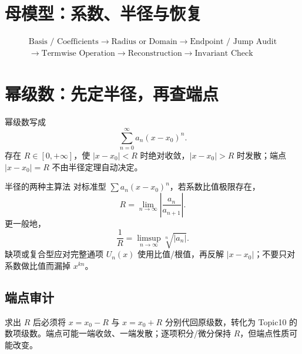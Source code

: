 \documentclass[11pt,a4paper,fontset=fandol]{ctexart}
\begin{document}
\section{母模型：系数、半径与恢复}
\[
\boxed{\begin{gathered}
\text{Basis / Coefficients}\to\text{Radius or Domain}\to\text{Endpoint / Jump Audit}\\
\to\text{Termwise Operation}\to\text{Reconstruction}\to\text{Invariant Check}
\end{gathered}}
\]
\begin{center}
\end{center}

\section{幂级数：先定半径，再查端点}
幂级数写成
\[
\sum_{n=0}^{\infty}a_n(x-x_0)^n.
\]
存在 $R\in[0,+\infty]$，使 $\lvert x-x_0\rvert<R$ 时绝对收敛，$\lvert x-x_0\rvert>R$ 时发散；端点 $\lvert x-x_0\rvert=R$ 不由半径定理自动决定。

\begin{methodbox}{半径的两种主算法}
对标准型 $\sum a_n(x-x_0)^n$，若系数比值极限存在，
\[
R=\lim_{n\to\infty}\left\lvert\frac{a_n}{a_{n+1}}\right\rvert.
\]
更一般地，
\[
\frac1R=\limsup_{n\to\infty}\sqrt[n]{\lvert a_n\rvert}.
\]
缺项或复合型应对完整通项 $U_n(x)$ 使用比值/根值，再反解 $\lvert x-x_0\rvert$；不要只对系数做比值而漏掉 $x^{kn}$。
\end{methodbox}

\subsection{端点审计}
求出 $R$ 后必须将 $x=x_0-R$ 与 $x=x_0+R$ 分别代回原级数，转化为 Topic10 的数项级数。端点可能一端收敛、一端发散；逐项积分/微分保持 $R$，但端点性质可能改变。
\end{document}
